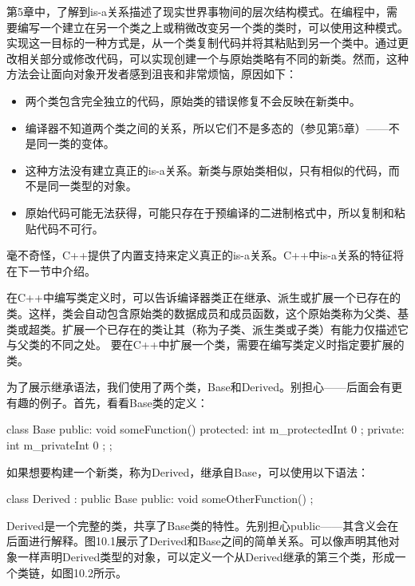 
第5章中，了解到is-a关系描述了现实世界事物间的层次结构模式。在编程中，需要编写一个建立在另一个类之上或稍微改变另一个类的类时，可以使用这种模式。实现这一目标的一种方式是，从一个类复制代码并将其粘贴到另一个类中。通过更改相关部分或修改代码，可以实现创建一个与原始类略有不同的新类。然而，这种方法会让面向对象开发者感到沮丧和非常烦恼，原因如下：

\begin{itemize}
\item
两个类包含完全独立的代码，原始类的错误修复不会反映在新类中。

\item
编译器不知道两个类之间的关系，所以它们不是多态的（参见第5章）——不是同一类的变体。

\item
这种方法没有建立真正的is-a关系。新类与原始类相似，只有相似的代码，而不是同一类型的对象。

\item
原始代码可能无法获得，可能只存在于预编译的二进制格式中，所以复制和粘贴代码不可行。
\end{itemize}

毫不奇怪，C++提供了内置支持来定义真正的is-a关系。C++中is-a关系的特征将在下一节中介绍。


在C++中编写类定义时，可以告诉编译器类正在继承、派生或扩展一个已存在的类。这样，类会自动包含原始类的数据成员和成员函数，这个原始类称为父类、基类或超类。扩展一个已存在的类让其（称为子类、派生类或子类）有能力仅描述它与父类的不同之处。 要在C++中扩展一个类，需要在编写类定义时指定要扩展的类。

为了展示继承语法，我们使用了两个类，Base和Derived。别担心——后面会有更有趣的例子。首先，看看Base类的定义：

\begin{cpp}
class Base
{
    public:
        void someFunction() {}
    protected:
        int m_protectedInt { 0 };
    private:
        int m_privateInt { 0 };
};
\end{cpp}

如果想要构建一个新类，称为Derived，继承自Base，可以使用以下语法：

\begin{cpp}
class Derived : public Base
{
    public:
        void someOtherFunction() {}
};
\end{cpp}

Derived是一个完整的类，共享了Base类的特性。先别担心public——其含义会在后面进行解释。图10.1展示了Derived和Base之间的简单关系。可以像声明其他对象一样声明Derived类型的对象，可以定义一个从Derived继承的第三个类，形成一个类链，如图10.2所示。

